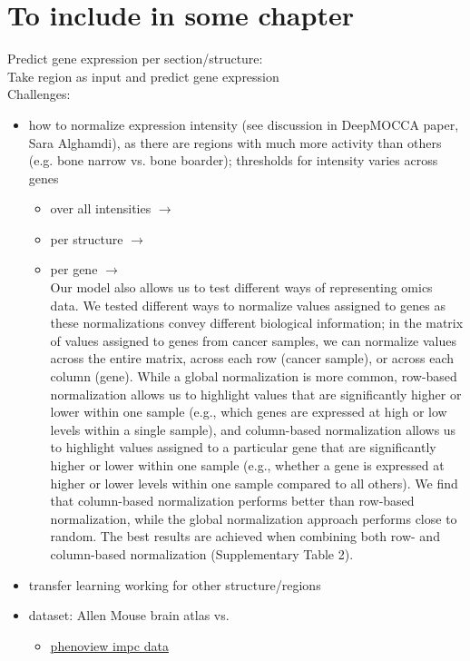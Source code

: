 \documentclass[]{article}
\begin{document}
\section*{To include in some chapter}
Predict gene expression per section/structure:\\
Take region as input and predict gene expression\\
Challenges:
\begin{itemize}
	\item how to normalize expression intensity (see discussion in DeepMOCCA paper, Sara Alghamdi), as there are regions with much more activity than others (e.g. bone narrow vs. bone boarder); thresholds for intensity varies across genes
	
	\begin{itemize}
		\item over all intensities $\rightarrow$
		\item per structure $\rightarrow$  
		\item per gene $\rightarrow$ \\
		
	Our model also allows us to test different ways of representing omics data. We
	tested different ways to normalize values assigned to genes as these normalizations
	convey different biological information; in the matrix of values assigned to genes from
	cancer samples, we can normalize values across the entire matrix, across each row
	(cancer sample), or across each column (gene). While a global normalization is more
	common, row-based normalization allows us to highlight values that are significantly
	higher or lower within one sample (e.g., which genes are expressed at high or low levels within a single sample), and column-based normalization allows us to highlight values
	assigned to a particular gene that are significantly higher or lower within one sample
	(e.g., whether a gene is expressed at higher or lower levels within one sample compared
	to all others). We find that column-based normalization performs better than row-based
	normalization, while the global normalization approach performs close to random. The
	best results are achieved when combining both row- and column-based normalization
	(Supplementary Table 2).	
	\end{itemize}
	\item transfer learning working for other structure/regions
	\item dataset: Allen Mouse brain atlas vs. 
	\begin{itemize}
		\item \href{https://www.har.mrc.ac.uk/harwell-news/phenoview-new-tool-compare-impc-data/}{phenoview impc data}
		

\end{itemize}
\end{itemize}
\end{document}
